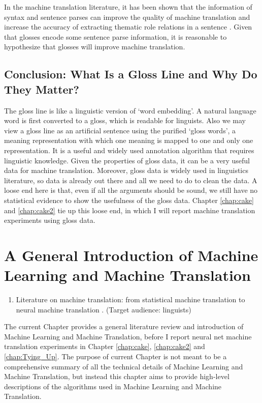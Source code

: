 \documentclass[final]{ua-thesis}
\numberwithin{equation}{section}
\begin{document}
In the machine translation literature, it has been shown that the information of syntax and sentence parses can improve the quality of machine translation \citep{Syntax_to_Translation} and increase the accuracy of extracting thematic role relations in a sentence \citep{Semantic_Role_Labeling}. Given that glosses encode some sentence parse information, it is reasonable to hypothesize that glosses will improve machine translation.      

\section{Conclusion: What Is a Gloss Line and Why Do They Matter?} 
The gloss line is like a linguistic version of `word embedding'. A natural language word is first converted to a gloss, which is readable for linguists. 
Also we may view a gloss line as an artificial sentence using the purified `gloss words', a meaning representation with which one meaning is mapped to one and only one representation. It is a useful and widely used annotation algorithm that requires linguistic knowledge. Given the properties of gloss data, it can be a very useful data for machine translation. Moreover, gloss data is widely used in linguistics literature, so data is already out there and all we need to do to clean the data.
A loose end here is that, even if all the arguments should be sound, we still have no statistical evidence to show the usefulness of the gloss data. Chapter \ref{chap:cake} and \ref{chap:cake2} tie up this loose end, in which I will report machine translation experiments using gloss data.  
\chapter{A General Introduction of Machine Learning and Machine Translation}
\label{chap:MT}

	\begin{enumerate}   
	\item Literature on machine translation: from statistical machine translation \citep{koehn2009statistical} to neural machine translation \citep{cho2014learning,cho2014properties,bahdanau2014neural, Koehn_NMT2017}. (Target audience: linguists)
	\end{enumerate}

The current Chapter provides a general literature review and introduction of Machine Learning and Machine Translation, before I report neural net machine translation experiments in Chapter \ref{chap:cake}, \ref{chap:cake2} and \ref{chap:Tying_Up}. The purpose of current Chapter is not meant to be a comprehensive summary of all the technical details of Machine Learning and Machine Translation, but instead this chapter aims to provide high-level descriptions of the algorithms used in Machine Learning and Machine Translation. 
\end{document}
